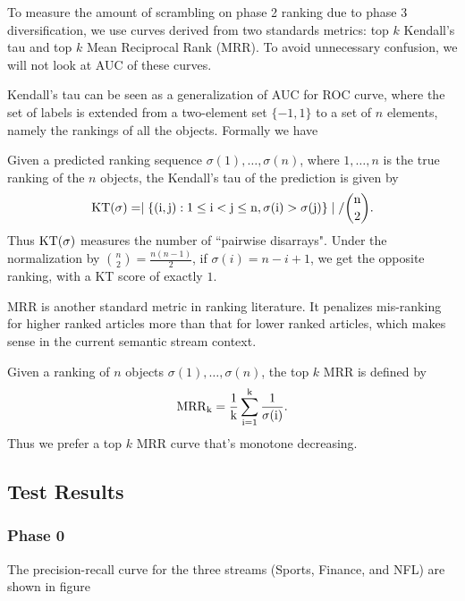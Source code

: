 To measure the amount of scrambling on phase 2 ranking due to phase 3 diversification, we use curves derived from two standards metrics: top $k$ Kendall's tau and top $k$ Mean Reciprocal Rank (MRR). To avoid unnecessary confusion, we will not look at AUC of these curves.

Kendall's tau can be seen as a generalization of AUC for ROC curve, where the set of labels is extended from a two-element set $\{-1,1\}$ to a set of $n$ elements, namely the rankings of all the objects. Formally we have
\begin{definition}
Given a predicted ranking sequence $\sigma(1), \ldots, \sigma(n)$, where $1,\ldots, n$ is the true ranking of the $n$ objects, the Kendall's tau of the prediction is given by
\begin{align*}
\rm{KT}(\sigma) = \mid \{ (i,j): 1 \le i< j \le n, \sigma(i) > \sigma(j) \} \mid / \binom{n}{2}.
\end{align*}
 Thus $\rm{KT}(\sigma)$ measures the number of ``pairwise disarrays". Under the normalization by $\binom{n}{2} = \frac{n(n-1)}{2}$, if $\sigma(i) = n-i+1$, we get the opposite ranking, with a KT score of exactly $1$.
\end{definition}

MRR is another standard metric in ranking literature. It penalizes mis-ranking for higher ranked articles more than that for lower ranked articles, which makes sense in the current semantic stream context.
\begin{definition}
Given a ranking of $n$ objects $\sigma(1),\ldots, \sigma(n)$, the top $k$ MRR is defined by
\begin{align*}
\rm{MRR}_k = \frac{1}{k}\sum_{i=1}^k \frac{1}{\sigma(i)}.
\end{align*}
Thus we prefer a top $k$ MRR curve that's monotone decreasing.
\end{definition}

\subsection{Test Results}

\subsubsection{Phase 0}

The precision-recall curve for the three streams (Sports, Finance, and NFL) are shown in figure 

